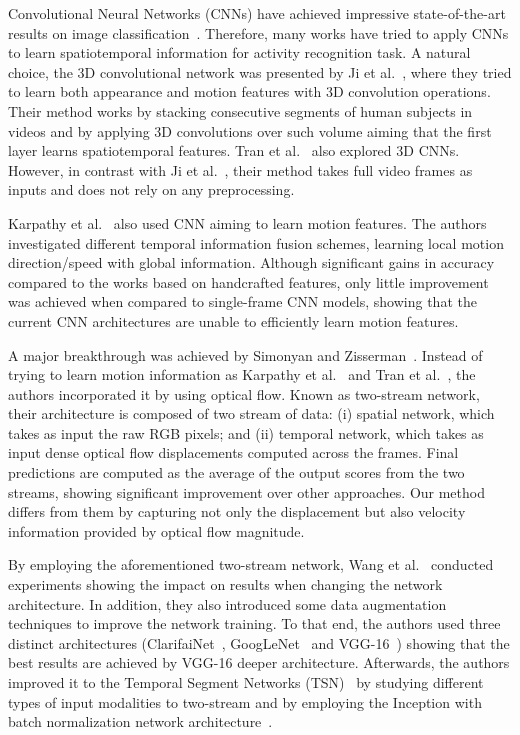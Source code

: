 \documentclass[10pt,conference]{IEEEtran}
\begin{document}
Convolutional Neural Networks (CNNs) have achieved impressive state-of-the-art results on image classification~\cite{Krizhevsky:2012}. Therefore, many works have tried to apply CNNs to learn spatiotemporal information for activity recognition task. A natural choice, the 3D convolutional network was presented by Ji et al.~\cite{Ji:2013}, where they tried to learn both appearance and motion features with 3D convolution operations. Their method works by stacking consecutive segments of human subjects in videos and by applying 3D convolutions over such volume aiming that the first layer learns spatiotemporal features. Tran et al.~\cite{Tran:2015} also explored 3D CNNs. However, in contrast with Ji et al.~\cite{Ji:2013}, their method takes full video frames as inputs and does not rely on any preprocessing.

Karpathy et al.~\cite{Karpathy:2014} also used CNN aiming to learn motion features. The authors investigated different temporal information fusion schemes, learning local motion direction/speed with global information. Although significant gains in accuracy compared to the works based on handcrafted features, only little improvement was achieved when compared to single-frame CNN models, showing that the current CNN architectures are unable to efficiently learn motion features.

A major breakthrough was achieved by Simonyan and Zisserman~\cite{Simonyan:2014}. Instead of trying to learn motion information as Karpathy et al.~\cite{Karpathy:2014} and Tran et al.~\cite{Tran:2015}, the authors incorporated it by using optical flow. Known as two-stream network, their architecture is composed of two stream of data: (i) spatial network, which takes as input the raw RGB pixels; and (ii) temporal network, which takes as input dense optical flow displacements computed across the frames. Final predictions are computed as the average of the output scores from the two streams, showing significant improvement over other approaches. Our method differs from them by capturing not only the displacement but also velocity information provided by optical flow magnitude.

By employing the aforementioned two-stream network, Wang et al.~\cite{Wang:2015} conducted experiments showing the impact on results when changing the network architecture. In addition, they also introduced some data augmentation techniques to improve the network training. To that end, the authors used three distinct architectures (ClarifaiNet~\cite{Zeiler:2014}, GoogLeNet~\cite{Szegedy:2015} and VGG-16~\cite{Simonyan:2014b}) showing that the best results are achieved by VGG-16 deeper architecture. Afterwards, the authors improved it to the Temporal Segment Networks (TSN)~\cite{Wang:2016} by studying different types of input modalities to two-stream and by employing the Inception with batch normalization network architecture~\cite{Ioffe:2015}.
\end{document}
